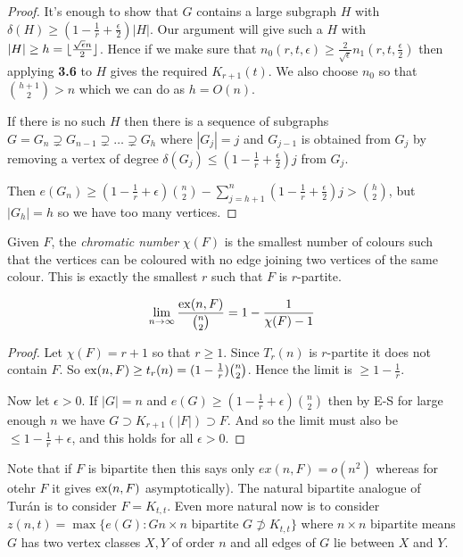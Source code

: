 \documentclass[10pt,a4paper]{article}
\begin{document}
\begin{proof}
It's enough to show that $G$ contains a large subgraph $H$ with $\delta(H) \geq (1-\frac{1}{r}+\frac{\epsilon}{2})|H|$. Our argument will give such a $H$ with $|H|\geq h = \lfloor \frac{\sqrt{\epsilon}n}{2} \rfloor$. Hence if we make sure that $n_0(r,t,\epsilon) \geq \frac{2}{\sqrt{\epsilon}}n_1(r,t,\frac{\epsilon}{2})$ then applying \textbf{3.6} to $H$ gives the required $K_{r+1}(t)$. We also choose $n_0$ so that $\binom{h+1}{2}>n$ which we can do as $h = O(n)$.

If there is no such $H$ then there is a sequence of subgraphs $G = G_n \supsetneq G_{n-1} \supsetneq \ldots \supsetneq G_h$ where $|G_j|=j$ and $G_{j-1}$ is obtained from $G_j$ by removing a vertex of degree $\delta(G_j) \leq (1-\frac{1}{r}+\frac{\epsilon}{2})j$ from $G_j$.

Then $e(G_n) \geq (1-\frac{1}{r}+\epsilon)\binom{n}{2} - \sum_{j=h+1}^n (1-\frac{1}{r}+\frac{\epsilon}{2})j > \binom{h}{2}$, but $|G_h| = h$ so we have too many vertices. 
\end{proof}
Given $F$, the \emph{chromatic number} $\chi(F)$ is the smallest number of colours such that the vertices can be coloured with no edge joining two vertices of the same colour. This is exactly the smallest $r$ such that $F$ is $r$-partite.
\begin{corollary}
\begin{align*}
\lim_{n\to \infty} \frac{\operatorname{ex}(n,F)}{\binom{n}{2}} = 1-\frac{1}{\chi(F)-1}
\end{align*}
\end{corollary}
\begin{proof}
Let $\chi(F) = r+1$ so that $r\geq 1$. Since $T_r(n)$ is $r$-partite it does not contain $F$. So $\operatorname{ex}(n,F) \geq t_r(n) = (1-\frac{1}{r})\binom{n}{2}$. Hence the limit is $\geq 1-\frac{1}{r}$.

Now let $\epsilon>0$. If $|G| = n$ and $e(G) \geq (1-\frac{1}{r}+\epsilon)\binom{n}{2}$ then by E-S for large enough $n$ we have $G \supset K_{r+1}(|F|) \supset F$. And so the limit must also be $\leq 1-\frac{1}{r}+\epsilon$, and this holds for all $\epsilon > 0$.
\end{proof}
Note that if $F$ is bipartite then this says only $ex(n,F) = o(n^2)$ whereas for otehr $F$ it gives $\operatorname{ex}(n,F)$ asymptotically). The natural bipartite analogue of Tur\'an is to consider $F=K_{t,t}$. Even more natural now is to consider $z(n,t) = \max\{e(G):G n\times n $ bipartite $ G \not\supset K_{t,t}\}$ where $n\times n$ bipartite means $G$ has two vertex classes $X,Y$ of order $n$ and all edges of $G$ lie between $X$ and $Y$.
\end{document}
